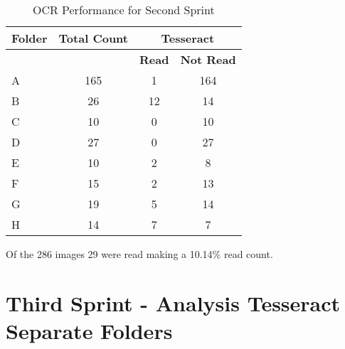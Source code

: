 \begin{table}[h]
    \centering
    \caption{OCR Performance for Second Sprint}
    \label{tab:second_print}
    \begin{tabular}{|l|c|c|c|}
        \hline
        \textbf{Folder} & \textbf{Total Count} & \multicolumn{2}{c|}{\textbf{Tesseract}}                     \\
        \hline
                        &                      & \textbf{Read}                           & \textbf{Not Read} \\
        \hline
        A               & 165                  & 1                                       & 164               \\
        B               & 26                   & 12                                      & 14                \\
        C               & 10                   & 0                                       & 10                \\
        D               & 27                   & 0                                       & 27                \\
        E               & 10                   & 2                                       & 8                 \\
        F               & 15                   & 2                                       & 13                \\
        G               & 19                   & 5                                       & 14                \\
        H               & 14                   & 7                                       & 7                 \\
        \hline
    \end{tabular}
\end{table}

Of the 286 images 29 were read making a 10.14\% read count.

\newpage

\section{Third Sprint - Analysis Tesseract Separate Folders}

